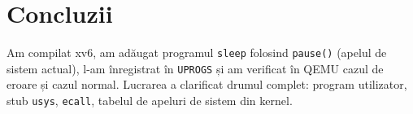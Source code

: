\documentclass[12pt,a4paper]{article}
\begin{document}
\section{Concluzii}
Am compilat xv6, am adăugat programul \texttt{sleep} folosind \texttt{pause()} (apelul de sistem actual), l-am înregistrat în \texttt{UPROGS} și am verificat în QEMU cazul de eroare și cazul normal. Lucrarea a clarificat drumul complet: program utilizator, stub \texttt{usys}, \texttt{ecall}, tabelul de apeluri de sistem din kernel.
\end{document}
